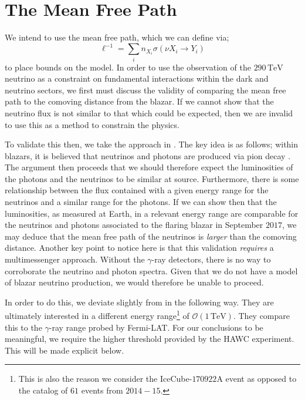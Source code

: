 \documentclass[10pt]{article}
\begin{document}
\section{The Mean Free Path}
We intend to use the mean free path, which we can define via;
\begin{equation}
  \ell^{-1} = \sum_{i}{n_{X_i} \sigma(\nu X_i \rightarrow Y_i)}
\end{equation}
to place bounds on the model. In order to use the observation of the $290 \, \textrm{TeV}$ neutrino as a constraint on fundamental interactions within the dark and neutrino sectors, we first must discuss the validity of comparing the mean free path to the comoving distance from the blazar. If we cannot show that the neutrino flux is not similar to that which could be expected, then we are invalid to use this as a method to constrain the physics.

To validate this then, we take the approach in \cite{Kelly}. The key idea is as follows; within blazars, it is believed that neutrinos and photons are produced via pion decay \cite{Padovani2018}. The argument then proceeds that we should therefore expect the luminosities of the photons and the neutrinos to be similar at source. Furthermore, there is some relationship between the flux contained with a given energy range for the neutrinos and a similar range for the photons. If we can show then that the luminosities, as measured at Earth, in a relevant energy range are comparable for the neutrinos and photons associated to the flaring blazar in September $2017$, we may deduce that the mean free path of the neutrinos is \textit{larger} than the comoving distance. Another key point to notice here is that this validation \textit{requires} a multimessenger approach. Without the $\gamma$-ray detectors, there is no way to corroborate the neutrino and photon spectra. Given that we do not have a model of blazar neutrino production, we would therefore be unable to proceed.

In order to do this, we deviate slightly from \cite{Kelly} in the following way. They are ultimately interested in a different energy range\footnote{This is also the reason we consider the IceCube-$170922$A event as opposed to the catalog of $61$ events from $2014-15$.} of $\mathcal{O}(1 \,\text{TeV})$. They compare this to the $\gamma$-ray range probed by Fermi-LAT. For our conclusions to be meaningful, we require the higher threshold provided by the HAWC experiment. This will be made explicit below.
\end{document}
